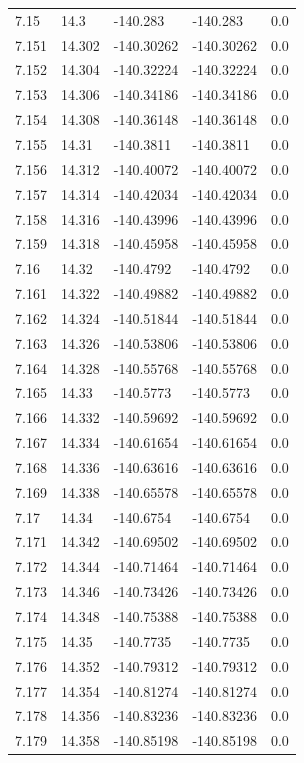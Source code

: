 \begin{tabular}{lllll}
7.15 & 14.3 & -140.283 & -140.283 & 0.0 \\
7.151 & 14.302 & -140.30262 & -140.30262 & 0.0 \\
7.152 & 14.304 & -140.32224 & -140.32224 & 0.0 \\
7.153 & 14.306 & -140.34186 & -140.34186 & 0.0 \\
7.154 & 14.308 & -140.36148 & -140.36148 & 0.0 \\
7.155 & 14.31 & -140.3811 & -140.3811 & 0.0 \\
7.156 & 14.312 & -140.40072 & -140.40072 & 0.0 \\
7.157 & 14.314 & -140.42034 & -140.42034 & 0.0 \\
7.158 & 14.316 & -140.43996 & -140.43996 & 0.0 \\
7.159 & 14.318 & -140.45958 & -140.45958 & 0.0 \\
7.16 & 14.32 & -140.4792 & -140.4792 & 0.0 \\
7.161 & 14.322 & -140.49882 & -140.49882 & 0.0 \\
7.162 & 14.324 & -140.51844 & -140.51844 & 0.0 \\
7.163 & 14.326 & -140.53806 & -140.53806 & 0.0 \\
7.164 & 14.328 & -140.55768 & -140.55768 & 0.0 \\
7.165 & 14.33 & -140.5773 & -140.5773 & 0.0 \\
7.166 & 14.332 & -140.59692 & -140.59692 & 0.0 \\
7.167 & 14.334 & -140.61654 & -140.61654 & 0.0 \\
7.168 & 14.336 & -140.63616 & -140.63616 & 0.0 \\
7.169 & 14.338 & -140.65578 & -140.65578 & 0.0 \\
7.17 & 14.34 & -140.6754 & -140.6754 & 0.0 \\
7.171 & 14.342 & -140.69502 & -140.69502 & 0.0 \\
7.172 & 14.344 & -140.71464 & -140.71464 & 0.0 \\
7.173 & 14.346 & -140.73426 & -140.73426 & 0.0 \\
7.174 & 14.348 & -140.75388 & -140.75388 & 0.0 \\
7.175 & 14.35 & -140.7735 & -140.7735 & 0.0 \\
7.176 & 14.352 & -140.79312 & -140.79312 & 0.0 \\
7.177 & 14.354 & -140.81274 & -140.81274 & 0.0 \\
7.178 & 14.356 & -140.83236 & -140.83236 & 0.0 \\
7.179 & 14.358 & -140.85198 & -140.85198 & 0.0 \\

\end{tabular}
